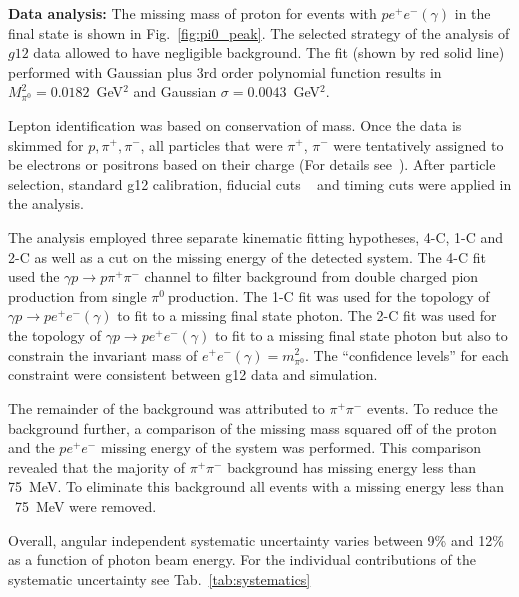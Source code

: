 \documentclass[aps,prc,onecolumn,floatfix,showpacs,preprintnumbers,amsmath,amssymb,superscriptaddress]{revtex4-1}
\def\pizT{$\pi^{0} \ $}
\def\epem{e^+e^-}
\begin{document}
\textbf{Data analysis:} The missing mass of proton for events 
with $pe^+e^-(\gamma)$ in the final state is shown in 
Fig.~\ref{fig:pi0_peak}. The selected strategy of the analysis
of $g12$ data allowed to have negligible background.
The fit (shown by red solid line) performed with Gaussian plus 
3rd order polynomial function results in $M_{\pi^0}^2 = 
0.0182$~GeV$^2$ and Gaussian $\sigma=0.0043$~GeV$^2$.  

Lepton identification was based on conservation of mass. 
Once the data is skimmed for $p, \pi^+, \pi^-$, all particles that were 
$\pi^+$, $\pi^-$ were tentatively assigned to be electrons or positrons 
based on their charge (For details see~\cite{mkthesis}).
 After particle selection, standard g12 calibration, fiducial cuts ~\cite{g12note} and timing cuts were applied in the analysis.

The analysis employed three separate kinematic fitting hypotheses, 
4-C, 1-C and 2-C as well as a cut on the missing energy of the detected system.
 The 4-C fit used the $\gamma p \to p \pi^+ \pi^-$ 
channel to filter background from double charged pion production 
from single \pizT production. The 1-C fit was used for the topology 
of $\gamma p \rightarrow p e^+e^-(\gamma)$ to fit to a missing final 
state photon. The 2-C fit was used for the topology of $\gamma p \rightarrow p e^+e^-(\gamma)$ 
to fit to a missing final state photon but also to constrain the invariant 
mass of $e^+e^-(\gamma) = m_{\pi^0}^2$. The ``confidence levels'' for each constraint 
were consistent between g12 data and simulation. 

The remainder of the background was attributed to $\pi^+\pi^-$ events. To reduce the background further, a comparison of the missing mass squared off of the proton and the $p \epem$ missing energy of the system was performed. This comparison revealed that the majority of $\pi^+\pi^-$ background has missing energy less than 75~MeV. To eliminate this background all events with a missing energy less than ~75~MeV were removed.

Overall, angular independent systematic uncertainty varies between
9\% and 12\% as a function of photon beam energy. For the individual contributions of the systematic uncertainty see Tab.~\ref{tab:systematics}

\end{document}
